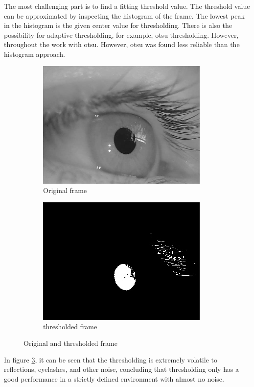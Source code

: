 The most challenging part is to find a fitting threshold value. The threshold value can be approximated by inspecting the histogram of the frame. The lowest peak in the histogram is the given center value for thresholding. There is also the possibility for adaptive thresholding, for example, otsu thresholding. However, throughout the work with otsu. However, otsu was found less reliable than the histogram approach. 

\begin{figure}[ht]
    \centering
    \begin{subfigure}{.5\textwidth}
      \centering
      \includegraphics[width=.9\linewidth]{plots/orig_canny.png}
      \caption{Original frame}
      \label{fig:th_orig}
    \end{subfigure}%
    \begin{subfigure}{.5\textwidth}
      \centering
      \includegraphics[width=.9\linewidth]{plots/thresholded.jpg}
      \caption{thresholded frame}
      \label{fig:th_thres}
    \end{subfigure}
    \caption{Original and thresholded frame}
    \label{fig:simple_thresh}
\end{figure}
In figure \ref{fig:simple_thresh}, it can be seen that the thresholding is extremely volatile to reflections, eyelashes, and other noise, concluding that thresholding only has a good performance in a strictly defined environment with almost no noise. 

